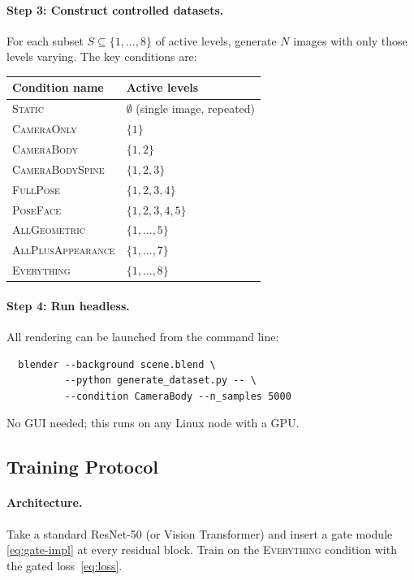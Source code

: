 \documentclass[11pt,a4paper]{article}
\begin{document}
\paragraph{Step 3: Construct controlled datasets.}
For each subset $S\subseteq\{1,\ldots,8\}$ of active levels,
generate $N$ images with only those levels varying.
The key conditions are:

\begin{center}
\begin{tabular}{@{}ll@{}}
\toprule
Condition name & Active levels \\
\midrule
\textsc{Static} & $\emptyset$ (single image, repeated) \\
\textsc{CameraOnly} & $\{1\}$ \\
\textsc{CameraBody} & $\{1,2\}$ \\
\textsc{CameraBodySpine} & $\{1,2,3\}$ \\
\textsc{FullPose} & $\{1,2,3,4\}$ \\
\textsc{PoseFace} & $\{1,2,3,4,5\}$ \\
\textsc{AllGeometric} & $\{1,\ldots,5\}$ \\
\textsc{AllPlusAppearance} & $\{1,\ldots,7\}$ \\
\textsc{Everything} & $\{1,\ldots,8\}$ \\
\bottomrule
\end{tabular}
\end{center}

\paragraph{Step 4: Run headless.}
All rendering can be launched from the command line:
\begin{verbatim}
  blender --background scene.blend \
          --python generate_dataset.py -- \
          --condition CameraBody --n_samples 5000
\end{verbatim}
No GUI needed; this runs on any Linux node with a GPU.

\subsection{Training Protocol}\label{sec:training}

\paragraph{Architecture.}
Take a standard ResNet-50 (or Vision Transformer)
and insert a gate module \eqref{eq:gate-impl}
at every residual block.
Train on the \textsc{Everything} condition
with the gated loss~\eqref{eq:loss}.
\end{document}
